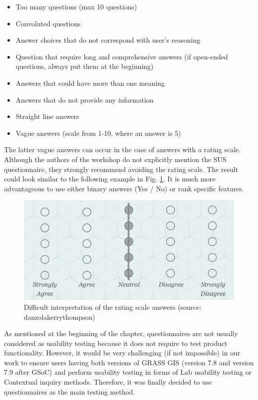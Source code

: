 \documentclass[a4paper,10pt,twoside]{article}
\begin{document}
\begin{itemize}
\item Too many questions (max 10 questions)
\item Convoluted questions
\item Answer choices that do not correspond with user's reasoning
\item Question that require long and comprehensive answers (if open-ended questions, always put them at the beginning)
\item Answers that could have more than one meaning
\item Answers that do not provide any information
\item Straight line answers
\item Vague answers (scale from 1-10, where an answer is 5)
\end{itemize}

\noindent The latter vague answers can occur in the case of answers with a rating scale. Although the authors of the workshop do not explicitly mention the SUS questionnaire, they strongly recommend avoiding the rating scale. The result could look similar to the following example in Fig. \ref{fig:blur_scale}. It is much more advantageous to use either binary answers (Yes / No) or rank specific features. 

\vspace{0.3cm}
\begin{figure}[hbt!] 
\begin{center}
\includegraphics[width=12.5cm]{../pictures/blur_scale.png} 
\caption[Difficult interpretation of the rating scale answers]{Difficult interpretation of the rating scale answers (source: danzolakerrythompson)}
\label{fig:blur_scale}
\end{center}
\end{figure}

\noindent As mentioned at the beginning of the chapter, questionnaires are not usually considered as usability testing because it does not require to test product functionality.
However, it would be very challenging (if not impossible) in our work to ensure users having both versions of GRASS GIS (version 7.8 and version 7.9 after GSoC) and perform usability testing in forms of Lab usability testing or Contextual inquiry methods. Therefore, it was finally decided to use questionnaires as the main testing method.
\end{document}
